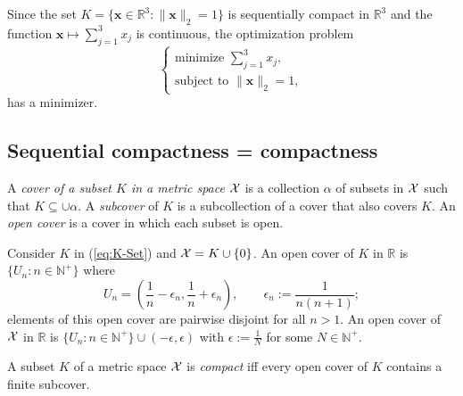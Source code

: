 \begin{exm}
  Since the set $K=\{\mathbf{x}\in \mathbb{R}^3: \|\mathbf{x}\|_2=1\}$
  is sequentially compact in $\mathbb{R}^3$ and the function
  $\mathbf{x}\mapsto \sum_{j=1}^3x_j$ is continuous,
  the optimization problem
  \begin{displaymath}
    \left\{
      \begin{array}{l}
        \text{minimize } \sum_{j=1}^3 x_j,
        \\
        \text{subject to } \|\mathbf{x}\|_2=1,
      \end{array}
    \right.
  \end{displaymath}
  has a minimizer.
\end{exm}

\subsection{Sequential compactness = compactness}
\label{sec:sequCompIsCompactness}

\begin{defn}
  \label{def:coverAndOpenCover}
  A \emph{cover of a subset $K$ in a metric space} ${\cal X}$
   is a collection $\alpha$ of subsets in ${\cal X}$
   such that $K \subseteq \cup \alpha$.
  A \emph{subcover} of $K$ is a subcollection of a cover
  that also covers $K$.
  An \emph{open cover} is a cover in which each subset is open.
\end{defn}

\begin{exm}
  \label{exm:openCoverOfSubsets}
  Consider $K$ in (\ref{eq:K-Set})
   and ${\cal X}=K\cup\{0\}$.
  An open cover of $K$ in $\mathbb{R}$
   is $\{U_n: n\in \mathbb{N}^+\}$
   where
  \begin{displaymath}
    U_n=\left(\frac{1}{n}-\epsilon_n,
      \frac{1}{n}+\epsilon_n\right),\qquad
    \epsilon_n := \frac{1}{n(n+1)}; 
  \end{displaymath}
  elements of this open cover are pairwise disjoint
  for all $n>1$.
  An open cover of ${\cal X}$ in $\mathbb{R}$
   is $\{U_n: n\in \mathbb{N}^+\}\cup (-\epsilon, \epsilon)$
   with $\epsilon:= \frac{1}{N}$ for some $N\in \mathbb{N}^+$.
\end{exm}

\begin{defn}
  \label{def:compactness}
  A subset $K$ of a metric space ${\cal X}$ is \emph{compact}
  iff every open cover of $K$ contains a finite subcover.
\end{defn}

